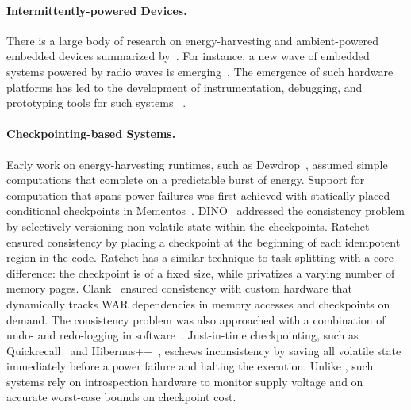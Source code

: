 \paragraph{Intermittently-powered Devices.}
There is a large body of research on energy-harvesting and ambient-powered embedded devices summarized by~\cite{prasad_comst_2014,sample_procieee_2013,huang:commag:2015,visser_procieee_2013,kamalinejad_commag_2015,ku_cst_2016}. For instance, a new wave of embedded systems powered by radio waves is emerging~\cite{patel_pervasive_2017,rf_powered_computing_gollakota_2014,wisp5,moo,zhao_rfid_2015,holleman_biocas_2008,thomas_jbcs_2012,naderiparizi_rfid_2015,rodriguez_tbcs_2015,liu_sigcomm_2013,kicksat,nadeau_naturebio_2017}. The emergence of such hardware platforms
has led to the development of instrumentation, debugging, and prototyping tools for such systems
~\cite{hester_sensys_2014,hester_sensys_2015,edb,capybara,stork,tan_infocom_2016,flicker}.

\paragraph{Checkpointing-based Systems.}
Early work on energy-harvesting runtimes, such as Dewdrop~\cite{dewdrop}, assumed simple computations that complete on a predictable burst of energy.
%
%
Support for computation that spans power failures was first achieved with statically-placed conditional checkpoints in Mementos~\cite{mementos}. 
DINO~\cite{dino} addressed the consistency problem by selectively versioning non-volatile state within the checkpoints. Ratchet~\cite{ratchet} ensured consistency by placing a checkpoint at the beginning of each idempotent region in the code. Ratchet has a similar technique to task splitting with a core difference: the checkpoint is of a fixed size, while \sys privatizes a varying number of memory pages.
%
%
Clank~\cite{hicks_isca_2017} ensured consistency with custom hardware that dynamically tracks WAR dependencies in memory accesses and checkpoints on demand. The consistency problem was also approached with a combination of undo- and redo-logging in software~\cite{baghsorkhi_cgo_2018}. Just-in-time checkpointing, such as Quickrecall~\cite{quickrecall} and Hibernus++~\cite{hibernusplusplus}, eschews inconsistency by saving all volatile state immediately before a power failure and halting the execution. Unlike \sys, such systems rely on introspection hardware to monitor supply voltage and on accurate worst-case bounds on checkpoint cost.

